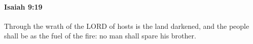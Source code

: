 
		\paragraph{Isaiah 9:19} %
			\label{ISAIAH-9-19}

			Through the wrath of the LORD of hosts is the land darkened, and the people shall be as the fuel of the fire: no man shall spare his brother.


